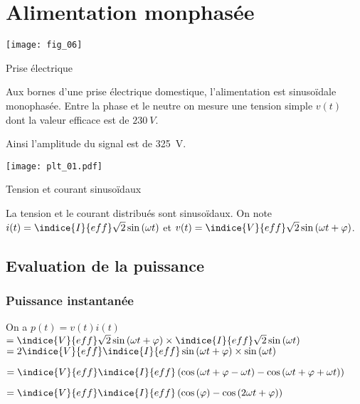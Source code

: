 \section{Alimentation monphasée}

\begin{marginfigure}
\centering
\texttt{[image: fig\_06]}
\caption{Prise électrique \label{fig:ge:cours:06}}
\end{marginfigure}

Aux bornes d'une prise électrique domestique, l'alimentation est sinusoïdale monophasée. Entre la phase et le neutre on mesure une tension simple $v(t)$ dont la valeur efficace est de $\SI{230}{V}$.

Ainsi l'amplitude du signal est de \SI{325}{V}.

\begin{marginfigure}
\centering
\texttt{[image: plt\_01.pdf]}
\caption{ Tension et courant sinusoïdaux\label{fig:ge:cours:plt:01}}

\end{marginfigure}

La tension et le courant distribués sont sinusoïdaux. On note 
$i(t)=\indice{I}{eff}\sqrt{2}\sin\left(\omega t\right)$ et 
$v(t)=\indice{V}{eff}\sqrt{2}\sin\left(\omega t + \varphi \right)$.

\subsection{Evaluation de la puissance}
\subsubsection{Puissance instantanée}

On a $p(t)=v(t)i(t)$ 
$=\indice{V}{eff}\sqrt{2}\sin\left(\omega t + \varphi \right)\times \indice{I}{eff}\sqrt{2}\sin\left(\omega t\right)$
$=2\indice{V}{eff}\indice{I}{eff}\sin\left(\omega t + \varphi \right)\times \sin\left(\omega t\right)$

$=\indice{V}{eff}\indice{I}{eff}
\left( 
\cos \left(\omega t + \varphi -\omega t\right) - 
\cos \left(\omega t + \varphi +\omega t\right) 
\right)
$

$=\indice{V}{eff}\indice{I}{eff}
\left( 
\cos \left( \varphi \right) - \cos \left(2\omega t + \varphi \right) 
\right)
$




